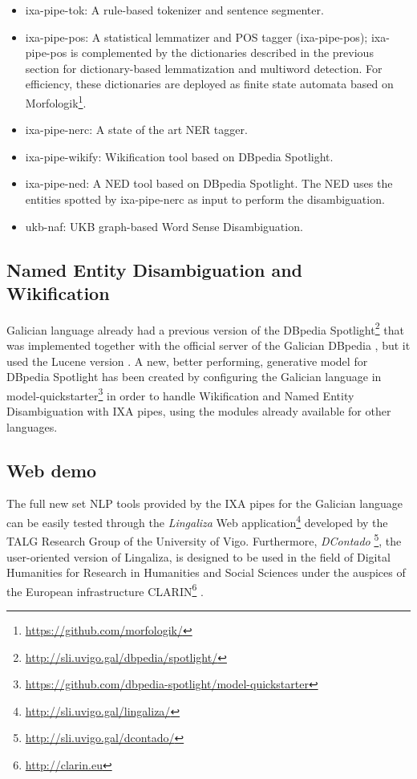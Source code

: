 \documentclass[10pt, a4paper]{article}
\begin{document}
\begin{itemize}
\item ixa-pipe-tok: A rule-based tokenizer and sentence segmenter.
\item ixa-pipe-pos: A statistical lemmatizer and POS tagger (ixa-pipe-pos); ixa-pipe-pos is complemented by the dictionaries described in the previous section for dictionary-based lemmatization and multiword detection. For efficiency, these dictionaries are deployed as finite state automata based on Morfologik\footnote{\url{https://github.com/morfologik/}}.
\item ixa-pipe-nerc: A state of the art NER tagger.
\item ixa-pipe-wikify: Wikification tool based on DBpedia Spotlight.
\item ixa-pipe-ned: A NED tool based on DBpedia Spotlight. The NED uses the entities spotted by ixa-pipe-nerc as input to perform the disambiguation.
\item ukb-naf: UKB graph-based Word Sense Disambiguation.
\end{itemize}

\subsection{Named Entity Disambiguation and Wikification}\label{sec:named-entity-disamb}

Galician language already had a previous version of the DBpedia Spotlight\footnote{\url{http://sli.uvigo.gal/dbpedia/spotlight/}} that was implemented together with the official server of the Galician DBpedia \cite{DBLP:journals/pdln/PortelaG16}, but it used the Lucene version \cite{isem2011mendesetal}. A new, better performing, generative model \cite{isem2013daiber} for DBpedia Spotlight has been created by configuring the Galician language in model-quickstarter\footnote{\url{https://github.com/dbpedia-spotlight/model-quickstarter}} in order to handle Wikification and Named Entity Disambiguation with IXA pipes, using the modules already available for other languages.

\subsection{Web demo}\label{sec:web-demo}

The full new set NLP tools provided by the IXA pipes for the Galician language can be easily tested through the \emph{Lingaliza} Web application\footnote{\url{http://sli.uvigo.gal/lingaliza/}} developed by the TALG Research Group of the University of Vigo. Furthermore, \emph{DContado} \footnote{\url{http://sli.uvigo.gal/dcontado/}}, the user-oriented version of Lingaliza, is designed to be used in the field of Digital Humanities for Research in Humanities and Social Sciences under the auspices of the European infrastructure CLARIN\footnote{\url{http://clarin.eu}}  \cite{DBLP:journals/pdln/BelGI16}.
\end{document}
